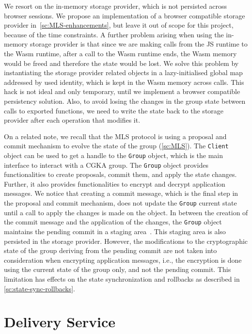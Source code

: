 We resort on the in-memory storage provider, which is not persisted
across browser sessions. We propose an implementation of a browser compatible
storage provider in~\cref{sc:MLS-enhancements}, but leave it out of scope
for this project, because of the time constraints.
A further problem arising when using the in-memory storage provider
is that since we are making calls from the JS runtime to the Wasm runtime,
after a call to the Wasm runtime ends, the Wasm memory would be freed and
therefore the state would be lost.
We solve this problem by instantiating the storage provider related objects
in a lazy-initialised global map addressed by used identity, which is kept in
the Wasm memory across calls. This hack is not ideal and only temporary,
until we implement a browser compatible persistency solution.
Also, to avoid losing the changes in the group state between calls to
exported functions, we need to write the state back to the storage provider
after each operation that modifies it.

On a related note, we recall that the MLS protocol is using a proposal
and commit mechanism to evolve the state of the group (\cref{sc:MLS}).
The \texttt{Client} object can be used to get a handle to the \texttt{Group}
object, which is the main interface to interact with a CGKA group.
The \texttt{Group} object provides functionalities to create proposals,
commit them, and apply the state changes. Further, it also provides
functionalities to encrypt and decrypt application messages.
We notice that creating a commit message, which is the final step
in the proposal and commit mechanism, does not update the \texttt{Group}
current state until a call to apply the changes is made on the object.
In between the creation of the commit message and the
application of the changes, the \texttt{Group} object maintains
the pending commit in a staging area~\cite{AWSMLSGroup}.
This staging area is also persisted in the storage provider.
However, the modifications to the cryptographic state of the group
deriving from the pending commit are not taken into consideration
when encrypting application messages, i.e., the encryption
is done using the current state of the group only, and not the pending commit.
This limitation has effects on the state synchronization and rollbacks
as described in \cref{sc:state-sync-rollbacks}.


\section{Delivery Service}\label{ssc:delivery-service}

